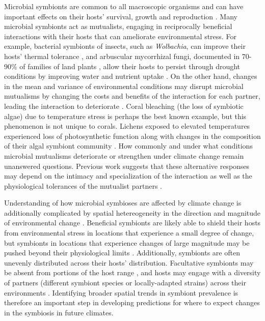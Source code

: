\documentclass[11pt]{article}
\let\cite\citep
\begin{document}
Microbial symbionts are common to all macroscopic organisms and can have important effects on their hosts' survival, growth and reproduction \cite{rodriguez2009fungal,mcfall2013animals}.
Many microbial symbionts act as mutualists, engaging in reciprocally beneficial interactions with their hosts that can ameliorate environmental stress. 
For example, bacterial symbionts of insects, such as \emph{Wolbachia}, can improve their hosts' thermal tolerance \citep{truitt2019wolbachia, renoz2019evolutionary}, and arbuscular mycorrhizal fungi, documented in 70-90\% of families of land plants \citep{parniske2008arbuscular}, allow their hosts to persist through drought conditions by improving water and nutrient uptake \citep{cheng2021elucidating}.
On the other hand, changes in the mean and variance of environmental conditions may disrupt microbial  mutualisms by changing the costs and benefits of the interaction for each partner, leading the interaction to deteriorate \citep{aslan2013mutualism, fowler2024microbial}. 
Coral bleaching (the loss of symbiotic algae) due to temperature stress \citep{sully2019global} is perhaps the best known example, but this phenomenon is not unique to corals.
Lichens exposed to elevated temperatures experienced loss of photosynthetic function along with changes in the composition of their algal symbiont community \citep{meyer2022climate}.
How commonly and under what conditions microbial mutualisms deteriorate or strengthen under climate change remain unanswered questions.
Previous work suggests that these alternative responses may depend on the intimacy and specialization of the interaction as well as the physiological tolerances of the mutualist partners \citep{toby2010mutualisms, warren2014mutualism, rafferty2015phenological}. 

Understanding of how microbial symbioses are affected by climate change is additionally complicated by spatial hetereogeneity in the direction and magnitude of environmental change \cite{ipcc_2021}. 
Beneficial symbionts are likely able to shield their hosts from environmental stress in locations that experience a small degree of change, but symbionts in locations that experience changes of large magnitude may be pushed beyond their physiological limits \cite{webster2008temperature}.
Additionally, symbionts are often unevenly distributed across their hosts' distribution.
Facultative symbionts may be absent from portions of the host range \cite{afkhami2014mutualist}, and hosts may engage with a diversity of partners (different symbiont species or locally-adapted strains) across their environments \cite{frade2008variation, rolshausen2018quantifying}.
Identifying broader spatial trends in symbiont prevalence is therefore an important step in developing predictions for where to expect changes in the symbiosis in future climates.
\end{document}
